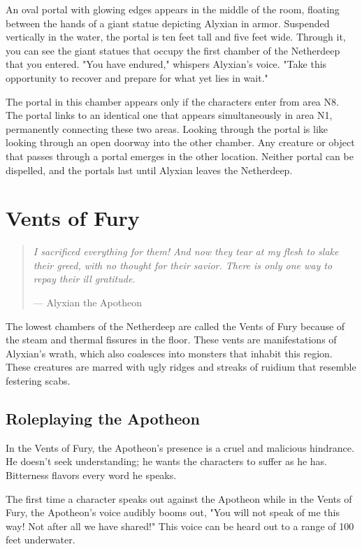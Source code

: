 \documentclass[a4paper, 11pt, bg=full, twocolumn, nooutline]{dndbook}
\begin{document}
\begin{DndReadAloud}
An oval portal with glowing edges appears in the middle of the room, floating between the hands of a giant statue depicting Alyxian in armor. Suspended vertically in the water, the portal is ten feet tall and five feet wide. Through it, you can see the giant statues that occupy the first chamber of the Netherdeep that you entered.
"You have endured," whispers Alyxian's voice. "Take this opportunity to recover and prepare for what yet lies in wait."
\end{DndReadAloud}

The portal in this chamber appears only if the characters enter from area N8. The portal links to an identical one that appears simultaneously in area N1, permanently connecting these two areas. Looking through the portal is like looking through an open doorway into the other chamber. Any creature or object that passes through a portal emerges in the other location. Neither portal can be dispelled, and the portals last until Alyxian leaves the Netherdeep.
\section{Vents of Fury}

\begin{quotation}
\em
I sacrificed everything for them! And now they tear at my flesh to slake their greed, with no thought for their savior. There is only one way to repay their ill gratitude.

\hfill --- Alyxian the Apotheon
\end{quotation}

The lowest chambers of the Netherdeep are called the Vents of Fury because of the steam and thermal fissures in the floor. These vents are manifestations of Alyxian's wrath, which also coalesces into monsters that inhabit this region. These creatures are marred with ugly ridges and streaks of ruidium that resemble festering scabs.

\subsection{Roleplaying the Apotheon}

In the Vents of Fury, the Apotheon's presence is a cruel and malicious hindrance. He doesn't seek understanding; he wants the characters to suffer as he has. Bitterness flavors every word he speaks.

The first time a character speaks out against the Apotheon while in the Vents of Fury, the Apotheon's voice audibly booms out, "You will not speak of me this way! Not after all we have shared!" This voice can be heard out to a range of 100 feet underwater.
\end{document}
